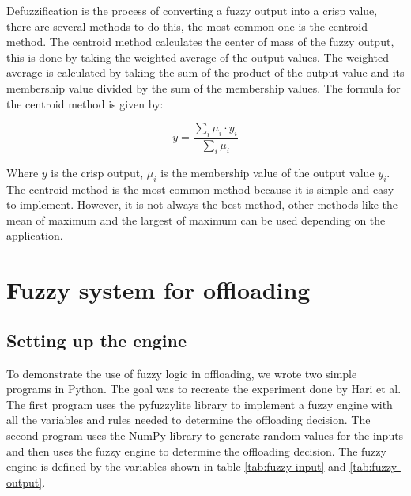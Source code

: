 Defuzzification is the process of converting a fuzzy output into a crisp value, there are several methods to do this,
the most common one is the centroid method. The centroid method calculates the center of mass of the fuzzy output, this
is done by taking the weighted average of the output values. The weighted average is calculated by taking the sum of
the product of the output value and its membership value divided by the sum of the membership values. The formula for
the centroid method is given by:

\begin{equation}
	y = \frac{\sum_{i} \mu_i \cdot y_i}{\sum_{i} \mu_i}
\end{equation}

Where $y$ is the crisp output, $\mu_i$ is the membership value of the output value $y_i$. The centroid method is the
most common method because it is simple and easy to implement. However, it is not always the best method, other methods
like the mean of maximum and the largest of maximum can be used depending on the application.

\section{Fuzzy system for offloading}
\label{sec:fuzzy-offloading}

\subsection{Setting up the engine}
\label{subsec:fuzzy-setup}

To demonstrate the use of fuzzy logic in offloading, we wrote two simple programs in Python. The goal was to recreate
the experiment done by Hari et al.\cite{Hari-et-al-2018} The first program uses the pyfuzzylite\cite{fuzzylite} library
to implement a fuzzy engine with all the variables and rules needed to determine the offloading decision. The second
program uses the NumPy library to generate random values for the inputs and then uses the fuzzy engine to determine
the offloading decision. The fuzzy engine is defined by the variables shown in table \ref{tab:fuzzy-input} and
\ref{tab:fuzzy-output}.

